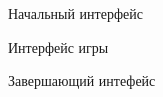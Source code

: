 \documentclass[a4paper,12pt]{article}
\begin{document}
\begin{figure}[h]
    \caption{Начальный интерфейс}\label{fig:StartMenu}
\end{figure}
\begin{figure}[h]
    \caption{Интерфейс игры}\label{fig:GameMenu}
\end{figure}
\begin{figure}[h]
    \caption{Завершающий интефейс}\label{fig:EndMenu}
\end{figure}
\end{document}
